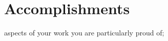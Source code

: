 \section{Accomplishments}\label{accomplishments}

aspects of your work you are particularly proud of;
